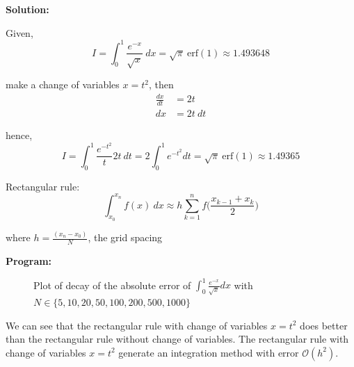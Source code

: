 \documentclass[a4paper,11pt]{report}
\begin{document}
\begin{enumerate}
    \textbf{Solution:}
    
    Given,
    \begin{equation*}
    I = \int_{0}^{1} \frac{e^{-x}}{\sqrt{x}}\ dx = \sqrt{\pi}\ \text{erf}(1) 
    \approx 1.493648
    \end{equation*}

    make a change of variables $x = t^{2}$, then 
    \begin{equation*}
    \begin{aligned}
    \frac{dx}{dt} &= 2t \\
    dx &= 2t\ dt
    \end{aligned}
    \end{equation*}
    
    hence, 
    \begin{equation*}
    I = \int_{0}^{1} \frac{e^{-t^{2}}}{t} 2t\ dt = 2 \int_{0}^{1} e^{-t^{2}} dt
    = \sqrt{\pi}\ \text{erf}(1) \approx 1.49365
    \end{equation*}

    Rectangular rule:
    \begin{equation*}
    \int_{x_{0}}^{x_{n}} f(x)\ dx \approx h \sum_{k=1}^{n} 
    f \Bigg(\frac{x_{k-1} + x_{k}}{2} \Bigg)
    \end{equation*}

    where $h = \displaystyle \frac{(x_{n} - x_{0})}{N}$, the grid spacing

    \vspace{1 cm}

    \textbf{Program:}
    

    \pagebreak

    \begin{figure}[ht!]
    \centering
    \resizebox{0.95\linewidth}{!}{}
    \caption{Plot of decay of the absolute error of $\displaystyle 
    \int_{0}^{1} \frac{e^{-x}}{\sqrt{x}} dx$ with $N \in \{5, 10, 20, 50, 
    100, 200, 500, 1000\}$}
    \end{figure} 

    

    \vspace{0.5cm}

    We can see that the rectangular rule with change of variables $x = t^{2}$ 
    does better than the rectangular rule without change of variables. The 
    rectangular rule with change of variables $x = t^{2}$ generate an 
    integration method with error $\mathcal{O}(h^{2})$.


\end{enumerate}
\end{document}
